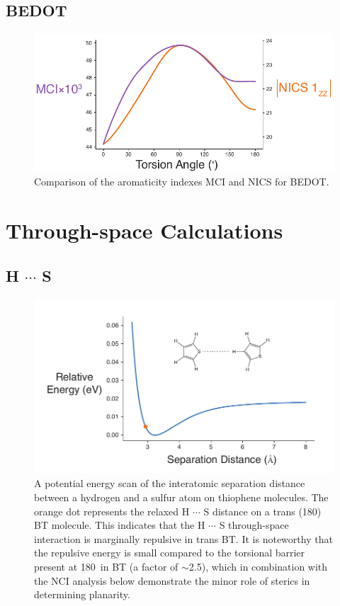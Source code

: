 \subsection{BEDOT}
\begin{figure}[hbt!]
    \centering
    \includegraphics{figures/append_aroma/pedot_aroma_compare_copy.pdf}
    \caption{Comparison of the aromaticity indexes MCI and NICS for BEDOT.}
    \label{fig:pedot_aroma_compare}
\end{figure}

\clearpage
\section{Through-space Calculations}
\subsection{\texorpdfstring{H $\cdots$ S}{HS}}
\begin{figure}[hbt!]
    \centering
    \includegraphics{figures/append_aroma/ts_t_t_copy.pdf}
    \caption{A potential energy scan of the interatomic separation distance between a hydrogen and a sulfur atom on thiophene molecules. The orange dot represents the relaxed H $\cdots$ S distance on a trans (180\textdegree) BT molecule. This indicates that the H $\cdots$ S through-space interaction is marginally repulsive in trans BT. It is noteworthy that the repulsive energy is small compared to the torsional barrier present at 180\textdegree \ in BT (a factor of $\sim$2.5), which in combination with the NCI analysis below demonstrate the minor role of sterics in determining planarity.}
    \label{fig:ts_t_t}
\end{figure}
\clearpage

